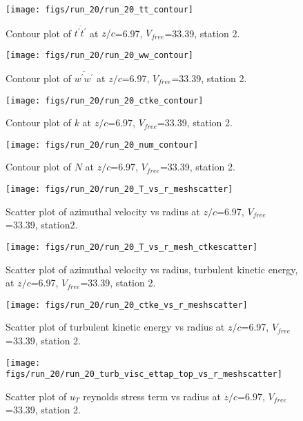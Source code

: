 \begin{figure}[H]
\centering
\texttt{[image: figs/run\_20/run\_20\_tt\_contour]}
\caption{Contour plot of $\overline{t^\prime t^\prime}$ at $z/c$=6.97, $V_{free}$=33.39, station 2.}
\end{figure}


\begin{figure}[H]
\centering
\texttt{[image: figs/run\_20/run\_20\_ww\_contour]}
\caption{Contour plot of $\overline{w^\prime w^\prime}$ at $z/c$=6.97, $V_{free}$=33.39, station 2.}
\end{figure}


\begin{figure}[H]
\centering
\texttt{[image: figs/run\_20/run\_20\_ctke\_contour]}
\caption{Contour plot of $k$ at $z/c$=6.97, $V_{free}$=33.39, station 2.}
\end{figure}


\begin{figure}[H]
\centering
\texttt{[image: figs/run\_20/run\_20\_num\_contour]}
\caption{Contour plot of $N$ at $z/c$=6.97, $V_{free}$=33.39, station 2.}
\end{figure}


\begin{figure}[H]
\centering
\texttt{[image: figs/run\_20/run\_20\_T\_vs\_r\_meshscatter]}
\caption{Scatter plot of azimuthal velocity vs radius at $z/c$=6.97, $V_{free}$=33.39, station2.}
\end{figure}


\begin{figure}[H]
\centering
\texttt{[image: figs/run\_20/run\_20\_T\_vs\_r\_mesh\_ctkescatter]}
\caption{Scatter plot of azimuthal velocity vs radius, turbulent kinetic energy, at $z/c$=6.97, $V_{free}$=33.39, station 2.}
\end{figure}


\begin{figure}[H]
\centering
\texttt{[image: figs/run\_20/run\_20\_ctke\_vs\_r\_meshscatter]}
\caption{Scatter plot of turbulent kinetic energy vs radius at $z/c$=6.97, $V_{free}$=33.39, station 2.}
\end{figure}


\begin{figure}[H]
\centering
\texttt{[image: figs/run\_20/run\_20\_turb\_visc\_ettap\_top\_vs\_r\_meshscatter]}
\caption{Scatter plot of $
u_T$ reynolds stress term vs radius at $z/c$=6.97, $V_{free}$=33.39, station 2.}
\end{figure}


